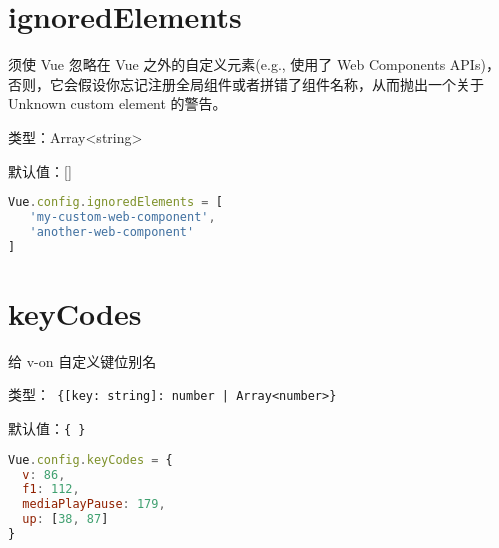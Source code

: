 \section{ignoredElements}

须使 Vue 忽略在 Vue 之外的自定义元素(e.g., 使用了 Web Components APIs)，否则，它会假设你忘记注册全局组件或者拼错了组件名称，从而抛出一个关于 Unknown custom element 的警告。

\begin{compactitem}
\item 类型：Array<string>
\item 默认值：[]
\end{compactitem}

\begin{lstlisting}[language=JavaScript]
Vue.config.ignoredElements = [
   'my-custom-web-component',
   'another-web-component'
]
\end{lstlisting}



\section{keyCodes}


给 v-on 自定义键位别名

\begin{compactitem}
\item 类型：\texttt{ \{[key: string]: number | Array<number>\} }
\item 默认值：\texttt{\{ \}}
\end{compactitem}



\begin{lstlisting}[language=JavaScript]
Vue.config.keyCodes = {
  v: 86,
  f1: 112,
  mediaPlayPause: 179,
  up: [38, 87]
}
\end{lstlisting}




\begin{lstlisting}[language=JavaScript]

\end{lstlisting}



\begin{lstlisting}[language=JavaScript]

\end{lstlisting}



\begin{lstlisting}[language=JavaScript]

\end{lstlisting}




